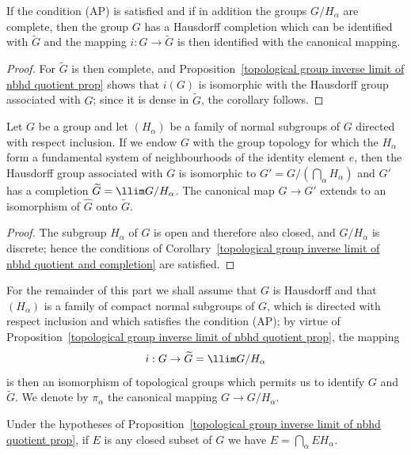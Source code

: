 \begin{corollary}\label{topological group inverse limit of nbhd quotient and completion}
If the condition (AP) is satisfied and if in addition the groups $G/H_\alpha$ are complete, then the group $G$ has a Hausdorff completion which can be identified with $\widetilde{G}$ and the mapping $i:G\to\widetilde{G}$ is then identified with the canonical mapping.
\end{corollary}
\begin{proof}
For $\widetilde{G}$ is then complete, and Proposition~\ref{topological group inverse limit of nbhd quotient prop} shows that $i(G)$ is isomorphic with the Hausdorff group associated with $G$; since it is dense in $\widetilde{G}$, the corollary follows.
\end{proof}
\begin{corollary}
Let $G$ be a group and let $(H_\alpha)$ be a family of normal subgroups of $G$ directed with respect inclusion. If we endow $G$ with the group topology for which the $H_\alpha$ form a fundamental system of neighbourhoods of the identity element $e$, then the Hausdorff group associated with $G$ is isomorphic to $G'=G/(\bigcap_\alpha H_\alpha)$ and $G'$ has a completion $\widetilde{G}=\llim G/H_\alpha$. The canonical map $G\to G'$ extends to an isomorphism of $\widehat{G}$ onto $\widetilde{G}$.
\end{corollary}
\begin{proof}
The subgroup $H_\alpha$ of $G$ is open and therefore also closed, and $G/H_\alpha$ is discrete; hence the conditions of Corollary~\ref{topological group inverse limit of nbhd quotient and completion} are satisfied.
\end{proof}
For the remainder of this part we shall assume that $G$ is Hausdorff and that $(H_\alpha)$ is a family of compact normal subgroups of $G$, which is directed with respect inclusion and which satisfies the condition (AP); by virtue of Proposition~\ref{topological group inverse limit of nbhd quotient prop}, the mapping
\[i:G\to\widetilde{G}=\llim G/H_\alpha\]
is then an isomorphism of topological groups which permits us to identify $G$ and $\widetilde{G}$. We denote by $\pi_\alpha$ the canonical mapping $G\to G/H_\alpha$.
\begin{lemma}\label{topological group closed subset is intersection of product}
Under the hypotheses of Proposition~\ref{topological group inverse limit of nbhd quotient prop}, if $E$ is any closed subset of $G$ we have $E=\bigcap_\alpha EH_\alpha$.
\end{lemma}
